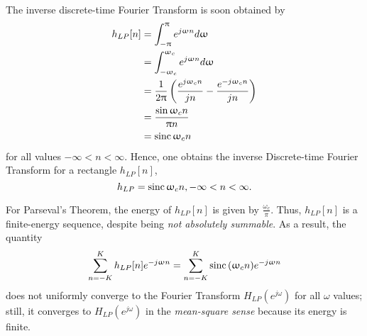 \documentclass[\documentfontsize, twocolumn]{\classname}
\begin{document}
The inverse discrete-time Fourier Transform is soon obtained by
\begin{align*}
    h_{LP}[n] &= \int_{-\uppi}^{\uppi} e^{j\upomega n}d\upomega \\
              &= \int_{-\upomega_c}^{\upomega_c} e^{j\upomega n}d\upomega \\
              &= \frac 1 {2\uppi} \left(\frac{e^{j\upomega_c n}}{jn} - \frac{e^{-j\upomega_c n}}{jn}\right)\\
              &= \frac {\sin {\upomega_c n}}{\uppi n}\\
              &= \operatorname{sinc} {\upomega_c n}
\end{align*}
for all values $-\infty < n < \infty$. Hence, one obtains the inverse Discrete-time Fourier Transform for a rectangle $h_{LP}[n]$,
\begin{equation}\label{eqn:inverseDiscreteTimeFourierTransformRectangle}
    h_{LP} = \operatorname{sinc} {\upomega_c n}, -\infty < n < \infty.
\end{equation}


For Parseval's Theorem, the energy of $h_{LP}[n]$ is given by $\frac {\omega_c}{\pi}$. Thus, $h_{LP}[n]$ is a finite-energy sequence, despite being \emph{not absolutely summable}. As a result, the quantity
\[
    \sum_{n=-K}^K h_{LP}[n] e^{-j\upomega n} = \sum_{n=-K}^K \operatorname{sinc} {(\upomega_c n)} e^{-j\upomega n}
\]
does not uniformly converge to the Fourier Transform $H_{LP}(e^{j\omega})$ for all $\omega$ values; still, it converges to $H_{LP}(e^{j\omega})$ in the \emph{mean-square sense} because its energy is finite.
\end{document}
